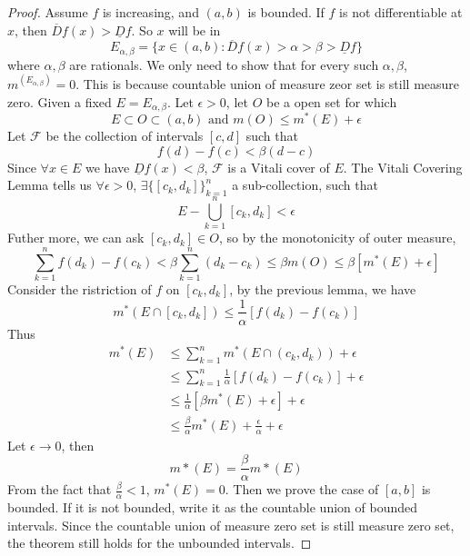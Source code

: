 \documentclass[lang=en, 12pt]{elegantbook}
\begin{document}
        \begin{proof}
            Assume $f$ is increasing, and $(a,b)$ is bounded. If $f$ is not differentiable at $x$, then $\overline{D}f(x) > \underline{D}f$.
        So $x$ will be in $$E_{\alpha, \beta} =\{x \in (a,b): \overline{D}f(x) > \alpha > \beta >\underline{D}f\}$$ 
        where $\alpha, \beta$ are rationals. We only need to show that for every such $\alpha, \beta$, $m^(E_{\alpha, \beta}) = 0$. 
        This is because countable union of measure zeor set is still measure zero.
            Given a fixed $E=E_{\alpha, \beta}$. Let $\epsilon> 0$, let $O$ be a open set for which
            \begin{equation}\label{LebesgueTheoremBoundedOpenSet}
                E \subset O \subset (a, b) \mbox{ and } m(O) \leq m^*(E) + \epsilon
            \end{equation}
            Let $\mathcal{F}$ be the collection of intervals $[c,d]$ such that
            $$ f(d) - f(c) < \beta(d-c)$$  
            Since $\forall x \in E$ we have $\underline{D}f(x)< \beta$, $\mathcal{F}$ is a Vitali cover of $E$. The Vitali Covering Lemma
        tells us $\forall \epsilon >0$, $\exists \{[c_k,d_k]\}_{k=1}^n$ a sub-collection, such that 
            \begin{equation}\label{LebesgueTheoremEstimation1}
                E- \bigcup_{k=1}^n [c_k, d_k] < \epsilon 
            \end{equation}  
            Futher more, we can ask $[c_k,d_k] \in O$, so by the monotonicity of outer measure,
            \begin{equation}
                \sum_{k=1}^{n} f(d_k) - f(c_k) < \beta \sum_{k=1}^{n} (d_k -c_k) \leq \beta m(O) \leq \beta [m^*(E) +\epsilon]
            \end{equation} 
            Consider the ristriction of $f$ on $[c_k,d_k]$, by the previous lemma, we have 
            $$m^*(E \cap [c_k, d_k]) \leq \frac{1}{\alpha}[f(d_k)-f(c_k)]$$
            Thus
            \begin{equation*}
                \begin{aligned}
                    m^*(E) &\leq \sum_{k=1}^{n}m^*(E\cap(c_k,d_k))+\epsilon \\
                    &\leq \sum_{k=1}^n \frac{1}{\alpha}[f(d_k)-f(c_k)] +\epsilon\\
                    &\leq \frac{1}{\alpha}[\beta m^*(E) +\epsilon] +\epsilon\\
                    &\leq \frac{\beta}{\alpha} m^*(E) +\frac{\epsilon}{\alpha} +\epsilon    
                \end{aligned}
            \end{equation*}
            Let $\epsilon \to 0$, then 
            $$m*(E) = \frac{\beta}{\alpha} m*(E)$$
            From the fact that $\frac{\beta}{\alpha}<1$, $m^*(E)=0$. Then we prove the case of $[a,b]$ is bounded. If it is not bounded, write 
        it as the countable union of bounded intervals. Since the countable union of measure zero set is still measure zero set, 
        the theorem still holds for the unbounded intervals.

        \end{proof}
\end{document}
